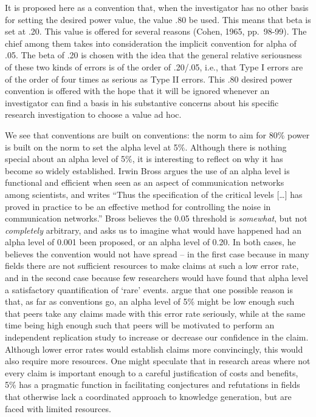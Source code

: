 \documentclass[
  oneside]{krantz}
\renewenvironment{quote}{\begin{VF}}{\end{VF}}
\begin{document}
\begin{quote}
It is proposed here as a convention that, when the investigator has no other basis for setting the desired power value, the value .80 be used. This means that beta is set at .20. This value is offered for several reasons (Cohen, 1965, pp.~98-99). The chief among them takes into consideration the implicit convention for alpha of .05. The beta of .20 is chosen with the idea that the general relative seriousness of these two kinds of errors is of the order of .20/.05, i.e., that Type I errors are of the order of four times as serious as Type II errors. This .80 desired power convention is offered with the hope that it will be ignored whenever an investigator can find a basis in his substantive concerns about his specific research investigation to choose a value ad hoc.
\end{quote}

We see that conventions are built on conventions: the norm to aim for 80\% power is built on the norm to set the alpha level at 5\%. Although there is nothing special about an alpha level of 5\%, it is interesting to reflect on why it has become so widely established. Irwin Bross \citeyearpar{bross_critical_1971} argues the use of an alpha level is functional and efficient when seen as an aspect of communication networks among scientists, and writes ``Thus the specification of the critical levels {[}\ldots{]} has proved in practice to be an effective method for controlling the noise in communication networks.''
Bross believes the 0.05 threshold is \emph{somewhat}, but not \emph{completely} arbitrary, and asks us to imagine what would have happened had an alpha level of 0.001 been proposed, or an alpha level of 0.20. In both cases, he believes the convention would not have spread -- in the first case because in many fields there are not sufficient resources to make claims at such a low error rate, and in the second case because few researchers would have found that alpha level a satisfactory quantification of `rare' events.
\citet{uygun_tunc_epistemic_2021} argue that one possible reason is that, as far as conventions go, an alpha level of 5\% might be low enough such that peers take any claims made with this error rate seriously, while at the same time being high enough such that peers will be motivated to perform an independent replication study to increase or decrease our confidence in the claim. Although lower error rates would establish claims more convincingly, this would also require more resources. One might speculate that in research areas where not every claim is important enough to a careful justification of costs and benefits, 5\% has a pragmatic function in facilitating conjectures and refutations in fields that otherwise lack a coordinated approach to knowledge generation, but are faced with limited resources.
\end{document}
